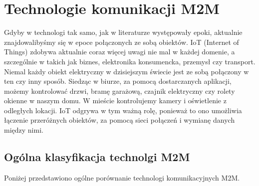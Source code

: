 \documentclass[12pt, a4paper, twoside]{report}
\begin{document}
\section{Technologie komunikacji M2M}
\hspace{1cm}Gdyby w technologi tak samo, jak w literaturze występowały epoki, aktualnie znajdowalibyśmy się w epoce połączonych ze sobą obiektów. IoT (Internet of Things) zdobywa aktualnie coraz więcej uwagi nie mal w każdej domenie, a szczególnie w takich jak biznes, elektronika konsumencka, przemysł czy transport. Niemal każdy obiekt elektryczny w dzisiejszym świecie jest ze sobą połączony w ten czy inny sposób. Siedząc w biurze, za pomocą dostarczanych aplikacji, możemy kontrolować drzwi, bramę garażową, czajnik elektryczny czy rolety okienne w naszym domu. W mieście kontrolujemy kamery i oświetlenie z odległych lokacji. IoT odgrywa w tym ważną rolę, ponieważ to ono umożliwia łączenie przeróżnych obiektów, za pomocą sieci połączeń i wymianę danych między nimi.\cite{LoRa-article}

\subsection{Ogólna klasyfikacja technolgi M2M}
\hspace{1cm}Poniżej przedstawiono ogólne porównanie technologi komunikacyjnych M2M.
\end{document}
